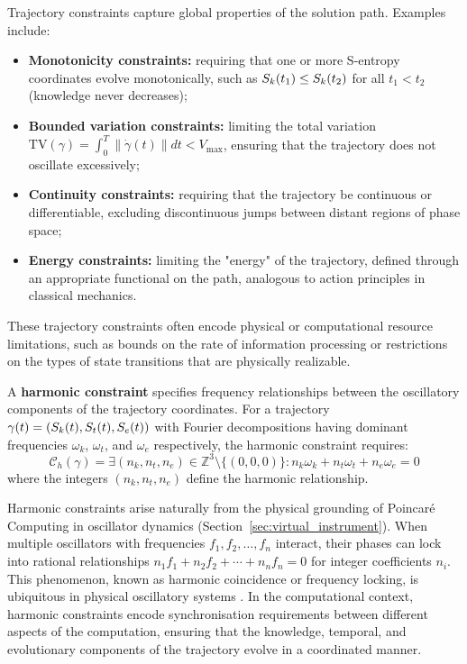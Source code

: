 Trajectory constraints capture global properties of the solution path. Examples include:
\begin{itemize}
    \item \textbf{Monotonicity constraints:} requiring that one or more S-entropy coordinates evolve monotonically, such as $S_k(t_1) \leq S_k(t_2)$ for all $t_1 < t_2$ (knowledge never decreases);
    \item \textbf{Bounded variation constraints:} limiting the total variation $\text{TV}(\gamma) = \int_0^T \|\dot{\gamma}(t)\| dt < V_{\max}$, ensuring that the trajectory does not oscillate excessively;
    \item \textbf{Continuity constraints:} requiring that the trajectory be continuous or differentiable, excluding discontinuous jumps between distant regions of phase space;
    \item \textbf{Energy constraints:} limiting the "energy" of the trajectory, defined through an appropriate functional on the path, analogous to action principles in classical mechanics.
\end{itemize}

These trajectory constraints often encode physical or computational resource limitations, such as bounds on the rate of information processing or restrictions on the types of state transitions that are physically realizable.

\begin{definition}
\label{def:harmonic_constraints}
A \textbf{harmonic constraint} specifies frequency relationships between the oscillatory components of the trajectory coordinates. For a trajectory $\gamma(t) = (S_k(t), S_t(t), S_e(t))$ with Fourier decompositions having dominant frequencies $\omega_k$, $\omega_t$, and $\omega_e$ respectively, the harmonic constraint requires:
\begin{equation}
\mathcal{C}_h(\gamma) = \exists (n_k, n_t, n_e) \in \mathbb{Z}^3 \setminus \{(0,0,0)\} : n_k \omega_k + n_t \omega_t + n_e \omega_e = 0
\label{eq:harmonic_constraint}
\end{equation}
where the integers $(n_k, n_t, n_e)$ define the harmonic relationship.
\end{definition}

Harmonic constraints arise naturally from the physical grounding of Poincaré Computing in oscillator dynamics (Section~\ref{sec:virtual_instrument}). When multiple oscillators with frequencies $f_1, f_2, \ldots, f_n$ interact, their phases can lock into rational relationships $n_1 f_1 + n_2 f_2 + \cdots + n_n f_n = 0$ for integer coefficients $n_i$. This phenomenon, known as harmonic coincidence or frequency locking, is ubiquitous in physical oscillatory systems \citep{arnold1989mathematical}. In the computational context, harmonic constraints encode synchronisation requirements between different aspects of the computation, ensuring that the knowledge, temporal, and evolutionary components of the trajectory evolve in a coordinated manner.

